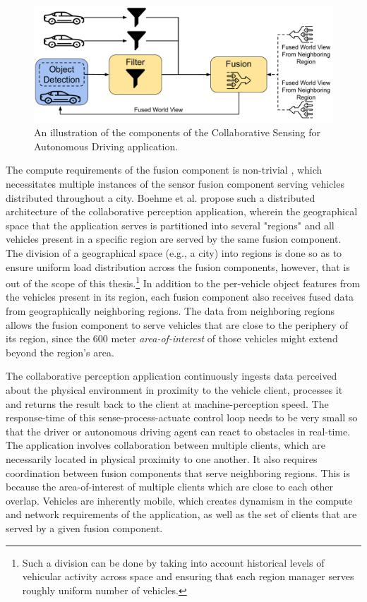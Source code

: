 \begin{figure}
\centering
\includegraphics[width=0.8\linewidth]{figures/oneedge/collaborative_driving_app.pdf}
\caption{An illustration of the components of the Collaborative Sensing for Autonomous Driving application.}
\label{fig:mapfusion_app_model}
\end{figure}

\par The compute requirements of the fusion component is non-trivial \cite{fusioneye}, which necessitates multiple instances of the sensor fusion component serving vehicles distributed throughout a city. Boehme et al. \cite{talkycars} propose such a distributed architecture of the collaborative perception application, wherein the geographical space that the application serves is partitioned into several "regions" and all vehicles present in a specific region are served by the same fusion component. The division of a geographical space (e.g., a city) into regions is done so as to ensure uniform load distribution across the fusion components, however, that is out of the scope of this thesis.\footnote{Such a division can be done by taking into account historical levels of vehicular activity across space and ensuring that each region manager serves roughly uniform number of vehicles.} In addition to the per-vehicle object features from the vehicles present in its region, each fusion component also receives fused data from geographically neighboring regions. The data from neighboring regions allows the fusion component to serve vehicles that are close to the periphery of its region, since the 600 meter \textit{area-of-interest} of those vehicles might extend beyond the region's area. 

\par The collaborative perception application continuously ingests data perceived about the physical environment in proximity to the vehicle client, processes it and returns the result back to the client at machine-perception speed. The response-time of this sense-process-actuate control loop needs to be very small so that the driver or autonomous driving agent can react to obstacles in real-time. The application involves collaboration between multiple clients, which are necessarily located in physical proximity to one another. It also requires coordination between fusion components that serve neighboring regions. This is because the area-of-interest of multiple clients which are close to each other overlap. Vehicles are inherently mobile, which creates dynamism in the compute and network requirements of the application, as well as the set of clients that are served by a given fusion component. 

